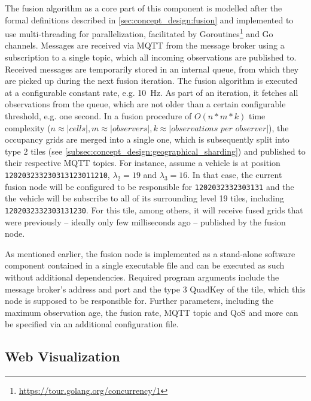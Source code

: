 The fusion algorithm as a core part of this component is modelled after the formal definitions described in \autoref{sec:concept_design:fusion} and implemented to use multi-threading for parallelization, facilitated by Goroutines\footnote{\url{https://tour.golang.org/concurrency/1}} and Go channels. Messages are received via MQTT from the message broker using a subscription to a single topic, which all incoming observations are published to. Received messages are temporarily stored in an internal queue, from which they are picked up during the next fusion iteration. The fusion algorithm is executed at a configurable constant rate, e.g. \SI{10}{\hertz}. As part of an iteration, it fetches all observations from the queue, which are not older than a certain configurable threshold, e.g. one second. In a fusion procedure of $O(n*m*k)$ time complexity ($n \approx |\textit{cells}|, m \approx |\textit{observers}|, k \approx |\textit{observations per observer}|$), the occupancy grids are merged into a single one, which is subsequently split into type 2 tiles (see \autoref{subsec:concept_design:geographical_sharding}) and published to their respective MQTT topics. For instance, assume a vehicle is at position \texttt{120203233230313123011210}, $\lambda_2 = 19$ and $\lambda_3 = 16$. In that case, the current fusion node will be configured to be responsible for \texttt{1202032332303131} and the the vehicle will be subscribe to all of its surrounding level 19 tiles, including \texttt{1202032332303131230}. For this tile, among others, it will receive fused grids that were previously – ideally only few milliseconds ago – published by the fusion node.
\par
\bigskip

As mentioned earlier, the fusion node is implemented as a stand-alone software component contained in a single executable file and can be executed as such without additional dependencies. Required program arguments include the message broker's address and port and the type 3 QuadKey of the tile, which this node is supposed to be responsible for. Further parameters, including the maximum observation age, the fusion rate, MQTT topic and QoS and more can be specified via an additional configuration file.

\subsection{Web Visualization}
\label{subsec:implementation:web_visualization}

